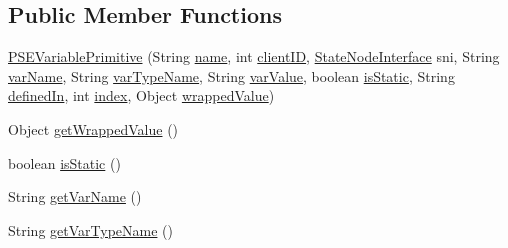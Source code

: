 \subsection*{Public Member Functions}
\begin{DoxyCompactItemize}
\item 
\hyperlink{classgov_1_1nasa_1_1jpf_1_1inspector_1_1common_1_1pse_1_1_p_s_e_variable_primitive_a90bcd68eaff9efcee89930f94ae5a4dc}{P\+S\+E\+Variable\+Primitive} (String \hyperlink{classgov_1_1nasa_1_1jpf_1_1inspector_1_1common_1_1pse_1_1_program_state_entry_a5fbdd37745a66317f1ea7738c3bda2a6}{name}, int \hyperlink{classgov_1_1nasa_1_1jpf_1_1inspector_1_1common_1_1pse_1_1_program_state_entry_a5743d1d799e3e1e864755f1040da1962}{client\+ID}, \hyperlink{interfacegov_1_1nasa_1_1jpf_1_1inspector_1_1server_1_1programstate_1_1_state_node_interface}{State\+Node\+Interface} sni, String \hyperlink{classgov_1_1nasa_1_1jpf_1_1inspector_1_1common_1_1pse_1_1_p_s_e_variable_ab22ccad7c4981bcadd0ddf2df3337689}{var\+Name}, String \hyperlink{classgov_1_1nasa_1_1jpf_1_1inspector_1_1common_1_1pse_1_1_p_s_e_variable_a646062a613747f6813b99f010f361222}{var\+Type\+Name}, String \hyperlink{classgov_1_1nasa_1_1jpf_1_1inspector_1_1common_1_1pse_1_1_p_s_e_variable_a898c9a245ba0da48961a76a29c8ee8b3}{var\+Value}, boolean \hyperlink{classgov_1_1nasa_1_1jpf_1_1inspector_1_1common_1_1pse_1_1_p_s_e_variable_ad4f7133731afc14a4680c1928e960942}{is\+Static}, String \hyperlink{classgov_1_1nasa_1_1jpf_1_1inspector_1_1common_1_1pse_1_1_p_s_e_variable_a2dd10359feb7e7fcf3a6f93c32b76c03}{defined\+In}, int \hyperlink{classgov_1_1nasa_1_1jpf_1_1inspector_1_1common_1_1pse_1_1_p_s_e_variable_aa1c82f7362843f3926328cb30c5067cd}{index}, Object \hyperlink{classgov_1_1nasa_1_1jpf_1_1inspector_1_1common_1_1pse_1_1_p_s_e_variable_primitive_a9765da8fdc3fa98de09d90006a715547}{wrapped\+Value})
\item 
Object \hyperlink{classgov_1_1nasa_1_1jpf_1_1inspector_1_1common_1_1pse_1_1_p_s_e_variable_primitive_a058b5acfab036a63320360179c242d06}{get\+Wrapped\+Value} ()
\item 
boolean \hyperlink{classgov_1_1nasa_1_1jpf_1_1inspector_1_1common_1_1pse_1_1_p_s_e_variable_aabbed2b1c69ba2d76924bfa645a1502e}{is\+Static} ()
\item 
String \hyperlink{classgov_1_1nasa_1_1jpf_1_1inspector_1_1common_1_1pse_1_1_p_s_e_variable_ad1dc9e7dbc65a93af7c028831963c26f}{get\+Var\+Name} ()
\item 
String \hyperlink{classgov_1_1nasa_1_1jpf_1_1inspector_1_1common_1_1pse_1_1_p_s_e_variable_ae3ebfecacb0600cb08019e22c220d888}{get\+Var\+Type\+Name} ()

\end{DoxyCompactItemize}
